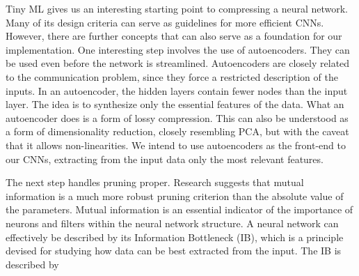 \documentclass[12pt, a4paper]{article}
\begin{document}
Tiny ML gives us an interesting starting point to compressing a neural network.  Many of its design criteria can serve as guidelines for more efficient CNNs. However, there are further concepts that can also serve as a foundation for our implementation. One interesting step involves the use of autoencoders. They can be used even before the network is streamlined. Autoencoders are closely related to the communication problem, since they force a restricted description of the inputs. In an autoencoder, the hidden layers contain fewer nodes than the input layer. The idea is to synthesize only the essential features of the data. What an autoencoder does is a form of lossy compression. This can also be understood as a form of dimensionality reduction, closely resembling PCA, but with the caveat that it allows non-linearities. We intend to use autoencoders as the front-end to our CNNs, extracting from the input data only the most relevant features. 

The next step handles pruning proper. Research suggests that mutual information is a much more robust pruning criterion than the absolute value of the parameters. Mutual information is an essential indicator of the importance of neurons and filters within the neural network structure. A neural network can effectively be described by its Information Bottleneck (IB), which is a principle devised for studying how data can be best extracted from the input. The IB is described by
\end{document}
